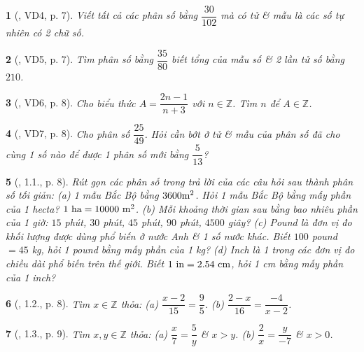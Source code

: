 \documentclass{article}
\newtheorem{baitoan}{}
\begin{document}
\begin{baitoan}[\cite{Binh_boi_duong_Toan_6_tap_2}, VD4, p. 7]
	Viết tất cả các phân số bằng $ \dfrac{30}{102}$ mà có tử \& mẫu là các số tự nhiên có 2 chữ số.
\end{baitoan}

\begin{baitoan}[\cite{Binh_boi_duong_Toan_6_tap_2}, VD5, p. 7]
	Tìm phân số bằng $\dfrac{35}{80}$ biết tổng của mẫu số \& 2 lần tử số bằng $210$.
\end{baitoan}

\begin{baitoan}[\cite{Binh_boi_duong_Toan_6_tap_2}, VD6, p. 8]
	Cho biểu thức $A = \dfrac{2n - 1}{n + 3}$ với $n\in\mathbb{Z}$. Tìm $n$ để $A\in\mathbb{Z}$.
\end{baitoan}

\begin{baitoan}[\cite{Binh_boi_duong_Toan_6_tap_2}, VD7, p. 8]
	Cho phân số $\dfrac{25}{49}$. Hỏi cần bớt ở tử \& mẫu của phân số đã cho cùng 1 số nào để được 1 phân số mới bằng $\dfrac{5}{13}$?
\end{baitoan}

\begin{baitoan}[\cite{Binh_boi_duong_Toan_6_tap_2}, 1.1., p. 8]
	Rút gọn các phân số trong trả lời của các câu hỏi sau thành phân số tối giản: (a) 1 mẫu Bắc Bộ bằng $\rm3600 m^2$. Hỏi 1 mẫu Bắc Bộ bằng mấy phần của 1 hecta? $\rm1\ ha = 10000\ m^2$. (b) Mỗi khoảng thời gian sau bằng bao nhiêu phần của 1 giờ: $15$ phút, $30$ phút, $45$ phút, $90$ phút, $4500$ giây? (c) Pound là đơn vị đo khối lượng được dùng phổ biến ở nước Anh \& 1 số nước khác. Biết $100$ pound $= 45$ {\rm kg}, hỏi 1 pound bằng mấy phần của {\rm1 kg}? (d) Inch là 1 trong các đơn vị đo chiều dài phổ biến trên thế giới. Biết $\rm1\ in = 2.54\ cm$, hỏi {\rm1 cm} bằng mấy phần của {\rm1 inch}?
\end{baitoan}

\begin{baitoan}[\cite{Binh_boi_duong_Toan_6_tap_2}, 1.2., p. 8]
	Tìm $x\in\mathbb{Z}$ thỏa: (a) $\dfrac{x - 2}{15} = \dfrac{9}{5}$. (b) $\dfrac{2 - x}{16} = \dfrac{-4}{x - 2}$.
\end{baitoan}

\begin{baitoan}[\cite{Binh_boi_duong_Toan_6_tap_2}, 1.3., p. 9]
	Tìm $x,y\in\mathbb{Z}$ thỏa: (a) $ \dfrac{x}{7} = \dfrac{5}{y}$ \& $x > y$. (b) $\dfrac{2}{x} = \dfrac{y}{-7}$ \& $x > 0$.
\end{baitoan}
\end{document}
